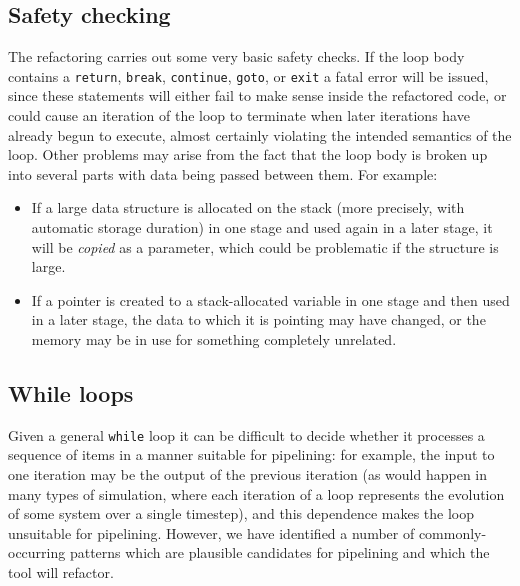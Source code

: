 \subsection{Safety checking}\label{safety-checking}

The refactoring carries out some very basic safety checks. If the loop
body contains a \texttt{return}, \texttt{break}, \texttt{continue},
\texttt{goto}, or \texttt{exit} a fatal error will be issued, since
these statements will either fail to make sense inside the refactored
code, or could cause an iteration of the loop to terminate when later
iterations have already begun to execute, almost certainly violating the
intended semantics of the loop. Other problems may arise from the fact that the loop body is broken up
into several parts with data being passed between them. For example:

\begin{itemize}
\item
  If a large data structure is allocated on the stack (more precisely,
  with automatic storage duration) in one stage and used again in a
  later stage, it will be \emph{copied} as a parameter, which could be
  problematic if the structure is large.
\item
  If a pointer is created to a stack-allocated variable in one stage and
  then used in a later stage, the data to which it is pointing may have
  changed, or the memory may be in use for something completely
  unrelated.
\end{itemize}


\subsection{While loops}\label{while-loops}

Given a general \texttt{while} loop it can be
difficult to decide whether it processes a sequence of items in a manner
suitable for pipelining: for example, the input to one iteration may be
the output of the previous iteration (as would happen in many types of
simulation, where each iteration of a loop represents the evolution of
some system over a single timestep), and this dependence makes the loop
unsuitable for pipelining. However, we have identified a number of
commonly-occurring patterns which are plausible candidates for
pipelining and which the tool will refactor.

